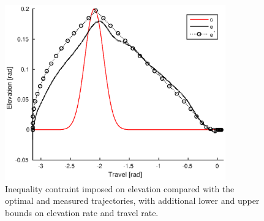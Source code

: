 \begin{figure}[hp]
	\centering
		\includegraphics[width=0.85\textwidth]{figures/4/closedloopConstrained25_cons.eps}
	\caption{Inequality contraint imposed on elevation compared with the optimal and measured trajectories, with additional lower and upper bounds on elevation rate and travel rate.}
	\label{fig:closedloopConstrained25_cons}
\end{figure}

